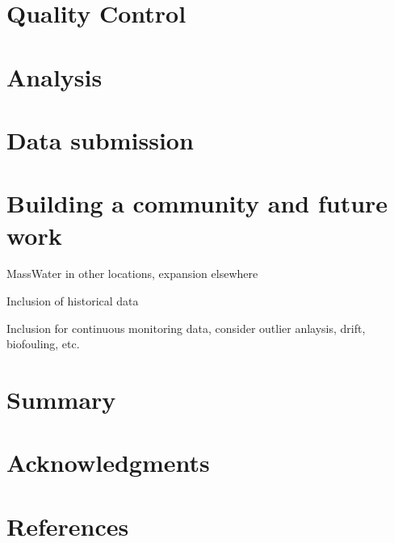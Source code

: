 \hypertarget{quality-control}{%
\section{Quality Control}\label{quality-control}}

\hypertarget{analysis}{%
\section{Analysis}\label{analysis}}

\hypertarget{data-submission}{%
\section{Data submission}\label{data-submission}}

\hypertarget{building-a-community-and-future-work}{%
\section{Building a community and future work}\label{building-a-community-and-future-work}}

MassWater in other locations, expansion elsewhere

Inclusion of historical data

Inclusion for continuous monitoring data, consider outlier anlaysis, drift, biofouling, etc.

\hypertarget{summary}{%
\section{Summary}\label{summary}}

\hypertarget{acknowledgments}{%
\section{Acknowledgments}\label{acknowledgments}}

\hypertarget{references}{%
\section*{References}\label{references}}

